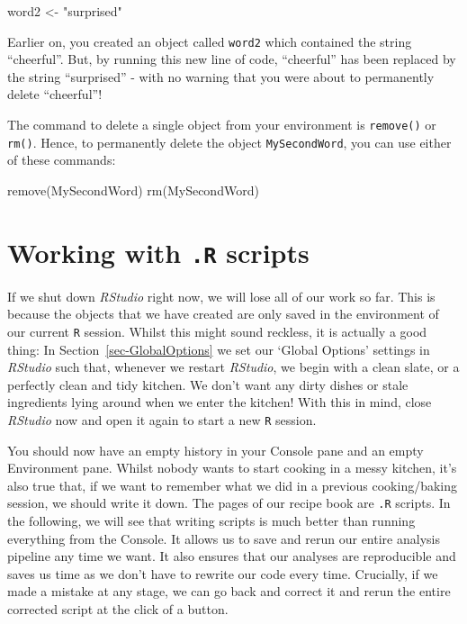 \documentclass[
  letterpaper,
  DIV=11,
  numbers=noendperiod]{scrreprt}
\newenvironment{Shaded}{\begin{snugshade}}{\end{snugshade}}
\newcommand{\FunctionTok}[1]{\textcolor[rgb]{0.28,0.35,0.67}{#1}}
\newcommand{\NormalTok}[1]{\textcolor[rgb]{0.00,0.23,0.31}{#1}}
\newcommand{\OtherTok}[1]{\textcolor[rgb]{0.00,0.23,0.31}{#1}}
\newcommand{\StringTok}[1]{\textcolor[rgb]{0.13,0.47,0.30}{#1}}
\begin{document}
\begin{Shaded}
\begin{Highlighting}[]
\NormalTok{word2 }\OtherTok{\textless{}{-}} \StringTok{"surprised"}
\end{Highlighting}
\end{Shaded}

Earlier on, you created an object called \texttt{word2} which contained
the string ``cheerful''. But, by running this new line of code,
``cheerful'' has been replaced by the string ``surprised'' - with no
warning that you were about to permanently delete
``cheerful''!~

The command to delete a single object from your environment is
\texttt{remove()} or \texttt{rm()}. Hence, to permanently delete the
object \texttt{MySecondWord}, you can use either of these commands:

\begin{Shaded}
\begin{Highlighting}[]
\FunctionTok{remove}\NormalTok{(MySecondWord)}
\FunctionTok{rm}\NormalTok{(MySecondWord)}
\end{Highlighting}
\end{Shaded}

\section{\texorpdfstring{Working with \texttt{.R}
scripts}{Working with .R scripts}}\label{sec-RScirpt}

If we shut down \emph{RStudio} right now, we will lose all of our work
so far. This is because the objects that we have created are only saved
in the environment of our current \texttt{R} session. Whilst this might
sound reckless, it is actually a good thing: In
Section~\ref{sec-GlobalOptions} we set our `Global Options' settings in
\emph{RStudio} such that, whenever we restart \emph{RStudio}, we begin
with a clean slate, or a perfectly clean and tidy kitchen. We don't want
any dirty dishes or stale ingredients lying around when we enter the
kitchen! With this in mind, close \emph{RStudio} now and open it again
to start a new \texttt{R} session.

You should now have an empty history in your Console pane and an empty
Environment pane. Whilst nobody wants to start cooking in a messy
kitchen, it's also true that, if we want to remember what we did in a
previous cooking/baking session, we should write it down. The pages of
our recipe book are \texttt{.R} scripts. In the following, we will see
that writing scripts is much better than running everything from the
Console. It allows us to save and rerun our entire analysis pipeline any
time we want. It also ensures that our analyses are reproducible and
saves us time as we don't have to rewrite our code every time.
Crucially, if we made a mistake at any stage, we can go back and correct
it and rerun the entire corrected script at the click of a button.
\end{document}
